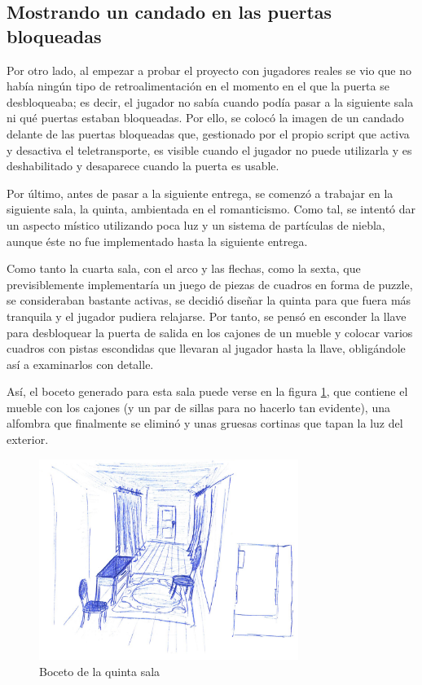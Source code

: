 \subsection{Mostrando un candado en las puertas bloqueadas}

Por otro lado, al empezar a probar el proyecto con jugadores reales se vio que no había ningún tipo de retroalimentación en el momento en el que la puerta se desbloqueaba; es decir, el jugador no sabía cuando podía pasar a la siguiente sala ni qué puertas estaban bloqueadas. Por ello, se colocó la imagen de un candado delante de las puertas bloqueadas que, gestionado por el propio script que activa y desactiva el teletransporte, es visible cuando el jugador no puede utilizarla y es deshabilitado y desaparece cuando la puerta es usable.

Por último, antes de pasar a la siguiente entrega, se comenzó a trabajar en la siguiente sala, la quinta, ambientada en el romanticismo. Como tal, se intentó dar un aspecto místico utilizando poca luz y un sistema de partículas de niebla, aunque éste no fue implementado hasta la siguiente entrega.

Como tanto la cuarta sala, con el arco y las flechas, como la sexta, que previsiblemente implementaría un juego de piezas de cuadros en forma de puzzle, se consideraban bastante activas, se decidió diseñar la quinta para que fuera más tranquila y el jugador pudiera relajarse. Por tanto, se pensó en esconder la llave para desbloquear la puerta de salida en los cajones de un mueble y colocar varios cuadros con pistas escondidas que llevaran al jugador hasta la llave, obligándole así a examinarlos con detalle.

Así, el boceto generado para esta sala puede verse en la figura \ref{fig:boceto-sala-5}, que contiene el mueble con los cajones (y un par de sillas para no hacerlo tan evidente), una alfombra que finalmente se eliminó y unas gruesas cortinas que tapan la luz del exterior.

\begin{figure}[!h]
\begin{center}
\includegraphics[width=0.75\textwidth]{imagenes/7/bocetos/boceto-sala-5.png}
\caption{Boceto de la quinta sala}
\label{fig:boceto-sala-5}
\end{center}
\end{figure}

